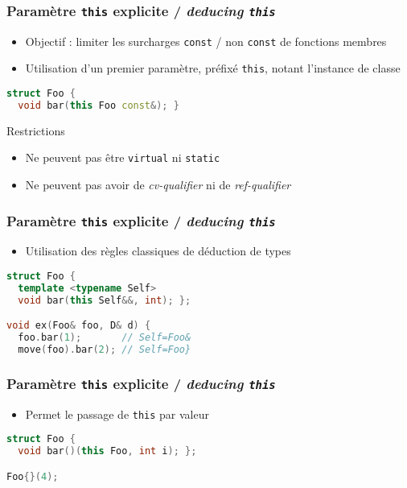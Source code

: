 \documentclass[C++.tex]{subfiles}
\begin{document}
\begin{frame}[fragile]
	\frametitle{Paramètre \lstinline|this| explicite / \textit{deducing \lstinline|this|}}
	\begin{itemize}
		\item Objectif : limiter les surcharges \lstinline|const| / non \lstinline|const| de fonctions membres
		\item Utilisation d'un premier paramètre, préfixé \lstinline|this|, notant l'instance de classe
	\end{itemize}

	\begin{lstlisting}[language=C++]
struct Foo {
  void bar(this Foo const&); }\end{lstlisting}

	\begin{alertblock}{Restrictions}
		\begin{itemize}
			\item Ne peuvent pas être \lstinline|virtual| ni \lstinline|static|
			\item Ne peuvent pas avoir de \textit{cv-qualifier} ni de \textit{ref-qualifier}
		\end{itemize}
	\end{alertblock}
\end{frame}

\begin{frame}[fragile]
	\frametitle{Paramètre \lstinline|this| explicite / \textit{deducing \lstinline|this|}}
	\begin{itemize}
		\item Utilisation des règles classiques de déduction de types 
	\end{itemize}

	\begin{lstlisting}[language=C++]
struct Foo {
  template <typename Self>
  void bar(this Self&&, int); };

void ex(Foo& foo, D& d) {
  foo.bar(1);       // Self=Foo&
  move(foo).bar(2); // Self=Foo}\end{lstlisting}
\end{frame}

\begin{frame}[fragile]
	\frametitle{Paramètre \lstinline|this| explicite / \textit{deducing \lstinline|this|}}
	\begin{itemize}
		\item Permet le passage de \lstinline|this| par valeur
	\end{itemize}

	\begin{lstlisting}[language=C++]
struct Foo {
  void bar()(this Foo, int i); };

Foo{}(4);\end{lstlisting}
\end{frame}
\end{document}
